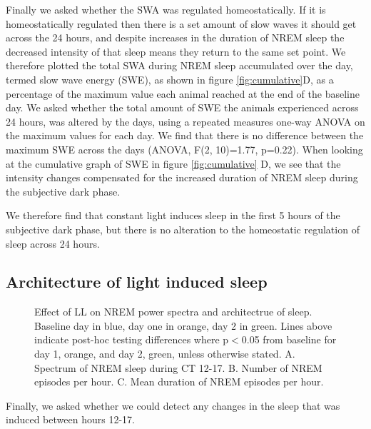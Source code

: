 Finally we asked whether the SWA was regulated homeostatically.
If it is homeostatically regulated then there is a set amount of
slow waves it should get across the 24 hours, and despite increases in the
duration of NREM sleep the decreased intensity of that sleep means they
return to the same set point.
We therefore plotted the total SWA during NREM sleep
accumulated over the day, termed
slow wave energy (SWE), as shown in
figure \ref{fig:cumulative}D, as a percentage of the maximum value each animal
reached at the end of the baseline day.
We asked whether the total amount of SWE the animals experienced across 24
hours, was altered by the days, using a repeated measures one-way ANOVA on the
maximum values for each day.
We find that there is no difference between the maximum SWE across the days
(ANOVA, F(2, 10)=1.77, p=0.22).
When looking at the cumulative graph of SWE in figure \ref{fig:cumulative}
D, we see that the intensity changes compensated for the increased
duration of NREM sleep during the subjective dark phase.

We therefore find that constant light induces sleep in the first 5 hours of
the subjective dark phase, but there is no alteration to the homeostatic
regulation of sleep across 24 hours.


\subsection{Architecture of light induced sleep}

\begin{landscape}
\begin{figure}[p]
    \centering
       \caption[Effect of LL on NREM power spectra and architectrue of sleep]{
	       Effect of LL on NREM power spectra and architectrue of sleep.
Baseline day in blue, day one in orange, day 2 in green.
Lines above indicate post-hoc testing differences where
p$<$0.05 from baseline for day 1, orange, and day 2, green, unless
otherwise stated.
A. Spectrum of NREM sleep during CT 12-17.
B. Number of NREM episodes per hour. 
C. Mean duration of NREM episodes per hour. 
}
    \label{fig:spectra}
\end{figure}
\end{landscape}

Finally, we asked whether we could detect any changes in the sleep that was
induced between hours 12-17.

